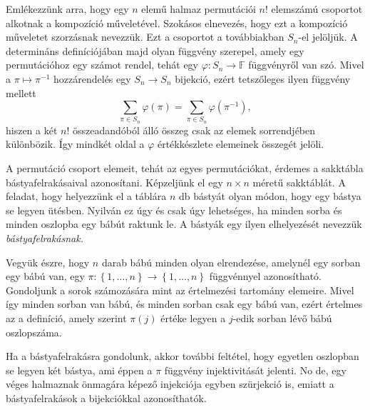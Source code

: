 \documentclass[a4paper, showtrims]{memoir}
\theoremstyle{plain}
\theoremstyle{remark}
\theoremstyle{definition}
\begin{document}
Emlékezzünk arra,
hogy egy $n$ elemű halmaz permutációi $n!$ elemszámú csoportot alkotnak a kompozíció műveletével.
Szokásos elnevezés, hogy ezt a kompozíció műveletet szorzásnak nevezzük.
Ezt a csoportot a továbbiakban $S_{n}$-el jelöljük.
A determináns definíciójában majd olyan függvény szerepel,
amely egy permutációhoz egy számot rendel,
tehát egy $\varphi:S_n\to\mathbb{F}$ függvényről van szó.
Mivel a $\pi\mapsto \pi^{-1}$ hozzárendelés egy $S_n\to S_n$ bijekció,
ezért tetszőleges ilyen függvény mellett
\[
	\sum_{\pi\in S_n}\varphi\left( \pi \right)=
	\sum_{\pi\in S_n}\varphi\left( \pi^{-1} \right),
\]
hiszen a két $n!$ összeadandóból álló összeg csak az elemek sorrendjében különbözik.
Így mindkét oldal a $\varphi$ értékkészlete elemeinek összegét jelöli.

A permutáció csoport elemeit,
tehát az egyes permutációkat,
érdemes a sakktábla bástyafelrakásaival azonosítani.
Képzeljünk el egy $n\times n$ méretű sakktáblát.
A feladat, hogy helyezzünk el a táblára $n$ db bástyát olyan módon,
hogy egy bástya se legyen ütésben.
Nyilván ez úgy és csak úgy lehetséges,
ha minden sorba és minden oszlopba egy bábút raktunk le.
A bástyák egy ilyen elhelyezését nevezzük \emph{bástyafelrakásnak.}

Vegyük észre, hogy $n$ darab bábú minden olyan elrendezése,
amelynél egy sorban egy bábú van, egy
\begin{math}
	\pi:\left\{ 1,\ldots,n \right\} \to \left\{ 1,\ldots,n \right\}
\end{math}
függvénnyel azonosítható.
Gondoljunk a sorok számozására mint az értelmezési tartomány elemeire.
Mivel így minden sorban van bábú,
és minden sorban csak egy bábú van,
ezért értelmes az a definíció,
amely szerint  $\pi\left( j \right)$ értéke legyen a $j$-edik sorban lévő bábú oszlopszáma.

Ha a bástyafelrakásra gondolunk,
akkor további feltétel,
hogy egyetlen oszlopban se legyen két bástya,
ami éppen a $\pi$ függvény injektivitását jelenti.
No de, egy véges halmaznak önmagára képező injekciója egyben szürjekció is,
emiatt a bástyafelrakások a bijekciókkal azonosíthatók.
\end{document}
